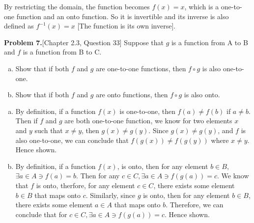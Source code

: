 \documentclass[addpoints]{exam}
\begin{document}
\begin{sloppypar}
\begin{questions}
\begin{solution}
            By restricting the domain, the function becomes $ f(x) = x $, which is a one-to-one function and an onto function. So it is invertible and its inverse is also defined as $ f^{-1}(x) = x $ [The function is its own inverse].
        \end{solution}
\pagebreak
    \question\textbf{Problem 7.}[Chapter 2.3, Question 33]
    Suppose that $g$ is a function from A to B and $f$ is a function from B to C.
    \begin{enumerate}[(a)]
        \item Show that if both $f$ and $g$ are one-to-one functions,
        then $f \circ g$ is also one-to-one.
        \item Show that if both $f$ and $g$ are onto functions, then $f \circ g$
        is also onto.
    \end{enumerate}
        \begin{solution}
            \begin{enumerate}[(a)]
                \item By definition, if a function $f(x)$ is one-to-one, then $ f(a) \neq f(b) $ if $ a \neq b $. Then if $ f $ and $g$ are both one-to-one function, we know for two elements $x$ and $y$ such that $ x \neq y $, then $ g(x) \neq g(y) $. Since $ g(x) \neq g(y) $, and $f$ is also one-to-one, we can conclude that $ f(g(x)) \neq f(g(y)) $ where $ x \neq y $. \\ Hence shown.
                \item By definition, if a function $f(x)$, is onto, then for any element $ b \in B$, $ \exists a \in A \ni f(a) = b $. Then for any $ c \in C, \exists a \in A \ni f(g(a)) = c $. We know that $f$ is onto, therfore, for any element $c \in C$, there exists some element $b \in B$ that maps onto $c$. Similarly, since $g$ is onto, then for any element $ b \in B $, there exists some element $ a \in A $ that maps onto $b$. Therefore, we can conclude that for $ c \in C, \exists a \in A \ni f(g(a)) = c $. Hence shown.
            \end{enumerate}
        \end{solution}


\end{questions}
\end{sloppypar}
\end{document}

